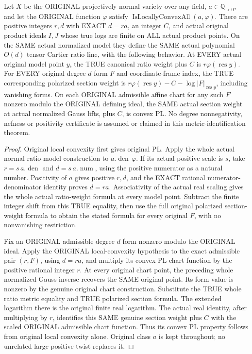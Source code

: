\begin{theorem}
\label{local:actual-prescribed-class-whole-normal-metric}
\leanok
{}
Let $X$ be the ORIGINAL projectively normal variety over any field,
$a\in\mathbb Q_{>0}$, and let the ORIGINAL function $\varphi$ satisfy
$\operatorname{IsLocallyConvexAll}(a,\varphi)$. There are positive integers
$r,d$ with EXACT $d=r a$, an integer $C$, and actual original product
ideals $I,J$ whose true logs are finite on ALL actual product points.
On the SAME actual normalized model they define the SAME actual
polynomial $O(d)$ tensor Cartier ratio line, with the following behavior.
At EVERY actual original model point $y$, the TRUE canonical ratio weight
plus $C$ is $r\varphi(\operatorname{res}y)$. For EVERY original degree $d$
form $F$ and coordinate-frame index, the TRUE corresponding polarized
section weight is
$r\varphi(\operatorname{res}y)-C-\log|F|_{\operatorname{res}y}$,
including vanishing forms. On each ORIGINAL admissible affine chart for
any such $F$ nonzero modulo the ORIGINAL defining ideal, the SAME actual
section weight at actual normalized Gauss lifts, plus $C$, is convex PL.
No degree nonnegativity, nefness or positivity certificate is assumed or
claimed in this metric-identification theorem.
\end{theorem}
\begin{proof}
Original local convexity first gives original PL. Apply the whole actual
normal ratio-model construction to $a.\operatorname{den}\,\varphi$.
If its actual positive scale is $s$, take
$r=s\,a.\operatorname{den}$ and $d=s\,a.\operatorname{num}$, using the
positive numerator as a natural number. Positivity of $a$ gives positive
$r,d$, and the EXACT rational numerator-denominator identity proves
$d=ra$. Associativity of the actual real scaling gives the whole actual
ratio-weight formula at every model point. Subtract the finite integer
shift from this TRUE equality, then use the full original polarized
section-weight formula to obtain the stated formula for every original
$F$, with no nonvanishing restriction.

Fix an ORIGINAL admissible degree $d$ form nonzero modulo the ORIGINAL
ideal. Apply the ORIGINAL local-convexity hypothesis to the exact
admissible pair $(r,F)$, using $d=ra$, and multiply its convex PL chart
function by the positive rational integer $r$. At every original chart
point, the preceding whole normalized Gauss inverse recovers the SAME
original point. Its form value is nonzero by the genuine original chart
construction. Substitute the TRUE whole ratio metric equality and TRUE
polarized section formula. The extended logarithm there is the original
finite real logarithm. The actual real identity, after multiplying by
$r$, identifies this SAME genuine section weight plus $C$ with the
scaled ORIGINAL admissible chart function. Thus its convex PL property
follows from original local convexity alone. Original class $a$ is kept
throughout; no unrelated large positive twist replaces it.
\end{proof}
